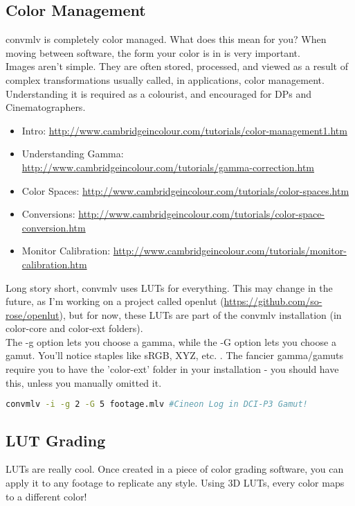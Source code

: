 \documentclass[a4paper,12pt]{article}
\begin{document}
	\subsection{Color Management}
		convmlv is completely color managed. What does this mean for you? When moving between software, the form your color is in is very important.\\
		
		Images aren't simple. They are often stored, processed, and viewed as a result of complex transformations usually called, 
        in applications, color management. Understanding it is required as a colourist, and encouraged for DPs and Cinematographers.
		
		\begin{itemize}
			\item Intro: \url{http://www.cambridgeincolour.com/tutorials/color-management1.htm}
			\item Understanding Gamma: \url{http://www.cambridgeincolour.com/tutorials/gamma-correction.htm}
			\item Color Spaces: \url{http://www.cambridgeincolour.com/tutorials/color-spaces.htm}
			\item Conversions: \url{http://www.cambridgeincolour.com/tutorials/color-space-conversion.htm}
			\item Monitor Calibration: \url{http://www.cambridgeincolour.com/tutorials/monitor-calibration.htm}
		\end{itemize}
		
		Long story short, convmlv uses LUTs for everything. This may change in the future, as I'm working on a project called
		openlut (\url{https://github.com/so-rose/openlut}), but for now, these LUTs are part of the convmlv installation (in color-core and color-ext folders).\\
		
		The -g option lets you choose a gamma, while the -G option lets you choose a gamut. You'll notice staples like sRGB, XYZ, etc. .
		The fancier gamma/gamuts require you to have the 'color-ext' folder in your installation - you should have this, unless you manually omitted it.
		
\begin{lstlisting}[language=bash]
	convmlv -i -g 2 -G 5 footage.mlv #Cineon Log in DCI-P3 Gamut!
\end{lstlisting}

	\subsection{LUT Grading}
		LUTs are really cool. Once created in a piece of color grading software, you can apply it to any footage to replicate any style. Using 3D LUTs, every
		color maps to a different color!\\
		
\end{document}
